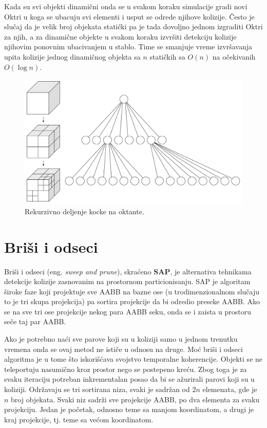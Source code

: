 \documentclass[12pt,oneside]{memoir}
\begin{document}
Kada su svi objekti dinamični onda se u svakom koraku simulacije  gradi novi Oktri u
koga se ubacuju svi elementi i usput se odrede njihove kolizije. Često je slučaj da je velik 
broj objekata statički pa je tada dovoljno jednom izgraditi Oktri za njih, a za dinamične objekte u svakom koraku 
izvršiti detekciju kolizije njihovim ponovnim ubacivanjem u stablo. Time se smanjuje vreme izvršavanja upita 
kolizije jednog dinamičnog objekta sa $n$ statičkih sa $O(n)$ na očekivanih $O(\log n)$.

\begin{figure}[h!]
	\begin{center}
	\includegraphics[scale=0.22]{octree.png}
	\end{center}
	\caption{Rekurzivno deljenje kocke na oktante.}
	\label{fig:oct}
\end{figure}

\section{Briši i odseci}
\label{subsec:sap}

Briši i odseci (eng. {\em sweep and prune}), skraćeno \textbf{SAP}, je alternativa tehnikama detekcije kolizije 
zasnovanim na prostornom particionisanju.
SAP je algoritam široke faze koji projektuje sve AABB
na bazne ose (u trodimenzionalnom slučaju to je tri skupa projekcija) pa sortira projekcije da bi odredio preseke AABB.
Ako se na sve tri ose projekcije nekog para AABB seku, onda se i zaista u prostoru seče taj par AABB.

Ako je potrebno naći sve parove koji su u koliziji samo u jednom trenutku vremena onda se ovaj metod ne ističe u odnosu na druge.
Moć briši i odseci algoritma je u tome što iskorišćava svojstvo temporalne koherencije. 
Objekti se ne teleportuju nasumično kroz prostor nego se postepeno kreću. 
Zbog toga je za svaku iteraciju potreban inkrementalan posao da bi se ažurirali parovi koji su u koliziji.
Održavaju se tri sortirana niza, svaki je sadržan od $2n$ elemenata, gde je $n$ broj objekata.
Svaki niz sadrži sve projekcije AABB, po dva elementa za svaku projekciju. 
Jedan je početak, odnosno teme sa manjom koordinatom, a drugi je kraj projekcije, tj. teme sa većom koordinatom. 
\end{document}
